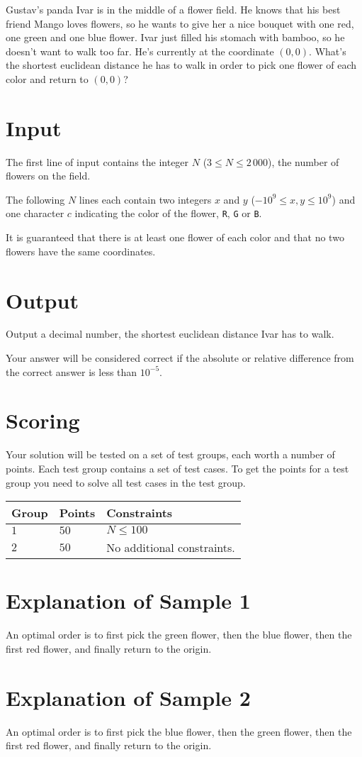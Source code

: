 \noindent

Gustav's panda Ivar is in the middle of a flower field.
He knows that his best friend Mango loves flowers, so he wants to give her a nice bouquet with one red, one green and one blue flower.
Ivar just filled his stomach with bamboo, so he doesn't want to walk too far.
He's currently at the coordinate $(0,0)$. What's the shortest euclidean distance he has to walk in order to pick one flower of each color and return to $(0,0)$?

\section*{Input}
The first line of input contains the integer $N$ ($3 \leq N \leq 2\,000$), the number of flowers on the field.

The following $N$ lines each contain two integers $x$ and $y$ ($-10^9 \leq x,y \leq 10^9$) and one character $c$ indicating the color
of the flower, \texttt{R}, \texttt{G} or \texttt{B}.

It is guaranteed that there is at least one flower of each color and that no two flowers have the same coordinates.

\section*{Output}
Output a decimal number, the shortest euclidean distance Ivar has to walk.

Your answer will be considered correct if the absolute or relative difference from the correct answer is less than $10^{-5}$.

\section*{Scoring}
Your solution will be tested on a set of test groups, each worth a number of points. Each test group contains
a set of test cases. To get the points for a test group you need to solve all test cases in the test group.

\noindent
\begin{tabular}{| l | l | p{12cm} |}
  \hline
  \textbf{Group} & \textbf{Points} & \textbf{Constraints} \\ \hline
  $1$    & $50$       & $N \leq 100$ \\ \hline
  $2$    & $50$       & No additional constraints. \\ \hline
\end{tabular}

\section*{Explanation of Sample 1}
An optimal order is to first pick the green flower, then the blue flower, then the first red flower, and finally return to the origin.

\section*{Explanation of Sample 2}
An optimal order is to first pick the blue flower, then the green flower, then the first red flower, and finally return to the origin.
